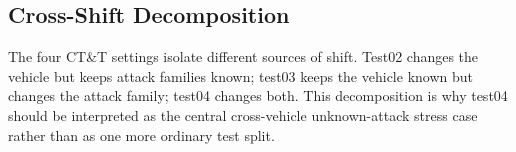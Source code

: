 \documentclass[runningheads]{llncs}
\begin{document}
\subsection{Cross-Shift Decomposition}
The four CT\&T settings isolate different sources of shift.  Test02 changes the vehicle but keeps attack families known; test03 keeps the vehicle known but changes the attack family; test04 changes both.  This decomposition is why test04 should be interpreted as the central cross-vehicle unknown-attack stress case rather than as one more ordinary test split.
\begin{table}[!htbp]
\caption{CT\&T shift decomposition with GRAIN window rows.}\label{tab:shift}
\centering\small
{}
\end{table}
\end{document}
